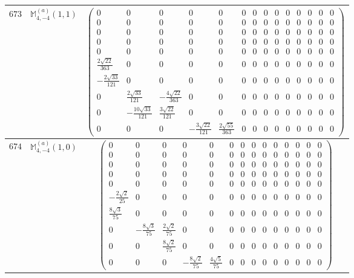 \documentclass[fleqn,8pt,landscape]{jsarticle}
\begin{document}
\begin{center}
\begin{longtable}{ccc}
$ 673 $ & $ \mathbb{M}_{4,-4}^{(a)}(1,1) $ & $ \begin{pmatrix} 0 & 0 & 0 & 0 & 0 & 0 & 0 & 0 & 0 & 0 & 0 & 0 & 0 & 0 \\ 0 & 0 & 0 & 0 & 0 & 0 & 0 & 0 & 0 & 0 & 0 & 0 & 0 & 0 \\ 0 & 0 & 0 & 0 & 0 & 0 & 0 & 0 & 0 & 0 & 0 & 0 & 0 & 0 \\ 0 & 0 & 0 & 0 & 0 & 0 & 0 & 0 & 0 & 0 & 0 & 0 & 0 & 0 \\ 0 & 0 & 0 & 0 & 0 & 0 & 0 & 0 & 0 & 0 & 0 & 0 & 0 & 0 \\ \frac{2 \sqrt{22}}{363} & 0 & 0 & 0 & 0 & 0 & 0 & 0 & 0 & 0 & 0 & 0 & 0 & 0 \\ - \frac{2 \sqrt{33}}{121} & 0 & 0 & 0 & 0 & 0 & 0 & 0 & 0 & 0 & 0 & 0 & 0 & 0 \\ 0 & \frac{2 \sqrt{33}}{121} & - \frac{4 \sqrt{22}}{363} & 0 & 0 & 0 & 0 & 0 & 0 & 0 & 0 & 0 & 0 & 0 \\ 0 & - \frac{10 \sqrt{33}}{121} & \frac{3 \sqrt{22}}{121} & 0 & 0 & 0 & 0 & 0 & 0 & 0 & 0 & 0 & 0 & 0 \\ 0 & 0 & 0 & - \frac{3 \sqrt{22}}{121} & \frac{2 \sqrt{55}}{363} & 0 & 0 & 0 & 0 & 0 & 0 & 0 & 0 & 0 \end{pmatrix} $ \\ \hline
$ 674 $ & $ \mathbb{M}_{4,-4}^{(a)}(1,0) $ & $ \begin{pmatrix} 0 & 0 & 0 & 0 & 0 & 0 & 0 & 0 & 0 & 0 & 0 & 0 & 0 & 0 \\ 0 & 0 & 0 & 0 & 0 & 0 & 0 & 0 & 0 & 0 & 0 & 0 & 0 & 0 \\ 0 & 0 & 0 & 0 & 0 & 0 & 0 & 0 & 0 & 0 & 0 & 0 & 0 & 0 \\ 0 & 0 & 0 & 0 & 0 & 0 & 0 & 0 & 0 & 0 & 0 & 0 & 0 & 0 \\ 0 & 0 & 0 & 0 & 0 & 0 & 0 & 0 & 0 & 0 & 0 & 0 & 0 & 0 \\ - \frac{2 \sqrt{2}}{25} & 0 & 0 & 0 & 0 & 0 & 0 & 0 & 0 & 0 & 0 & 0 & 0 & 0 \\ \frac{8 \sqrt{3}}{75} & 0 & 0 & 0 & 0 & 0 & 0 & 0 & 0 & 0 & 0 & 0 & 0 & 0 \\ 0 & - \frac{8 \sqrt{3}}{75} & \frac{2 \sqrt{2}}{75} & 0 & 0 & 0 & 0 & 0 & 0 & 0 & 0 & 0 & 0 & 0 \\ 0 & 0 & \frac{8 \sqrt{2}}{75} & 0 & 0 & 0 & 0 & 0 & 0 & 0 & 0 & 0 & 0 & 0 \\ 0 & 0 & 0 & - \frac{8 \sqrt{2}}{75} & \frac{4 \sqrt{5}}{75} & 0 & 0 & 0 & 0 & 0 & 0 & 0 & 0 & 0 \end{pmatrix} $ \\ \hline

\end{longtable}
\end{center}
\end{document}
